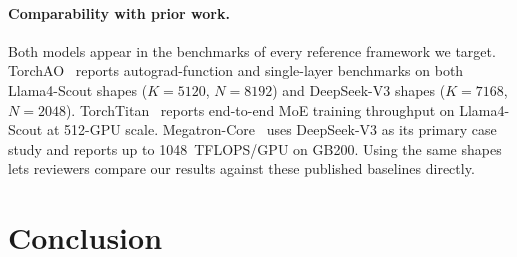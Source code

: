 \documentclass[11pt,a4paper]{article}
\theoremstyle{definition}
\begin{document}
\paragraph{Comparability with prior work.}
Both models appear in the benchmarks of every reference framework
we target.
TorchAO~\cite{torchao2025} reports autograd-function and
single-layer benchmarks on both Llama4-Scout shapes
($K{=}5120$, $N{=}8192$) and DeepSeek-V3 shapes
($K{=}7168$, $N{=}2048$).
TorchTitan~\cite{torchtitan2025} reports end-to-end MoE training
throughput on Llama4-Scout at 512-GPU scale.
Megatron-Core~\cite{nvidia2026megatronmoe} uses DeepSeek-V3 as its
primary case study and reports up to 1048~TFLOPS/GPU on GB200.
Using the same shapes lets reviewers compare our results against
these published baselines directly.

\section{Conclusion}
\end{document}

